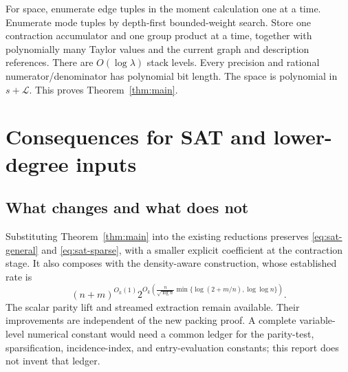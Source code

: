 \documentclass[11pt]{article}
\theoremstyle{remark}\newtheorem{remark}[theorem]{Remark}
\newcommand{\LL}{\mathcal L}
\begin{document}
For space, enumerate edge tuples in the moment calculation one at a time. Enumerate mode tuples by depth-first bounded-weight search. Store one contraction accumulator and one group product at a time, together with polynomially many Taylor values and the current graph and description references. There are $O(\log\lambda)$ stack levels. Every precision and rational numerator/denominator has polynomial bit length. The space is polynomial in $s+\LL$. This proves Theorem~\ref{thm:main}.

\section{Consequences for SAT and lower-degree inputs}
\label{sec:applications}

\subsection{What changes and what does not}
Substituting Theorem~\ref{thm:main} into the existing reductions preserves \eqref{eq:sat-general} and \eqref{eq:sat-sparse}, with a smaller explicit coefficient at the contraction stage. It also composes with the density-aware construction, whose established rate is
\[
 (n+m)^{O_k(1)}
 2^{O_k\left(\frac n{\sqrt{\log n}}
       \min\{\log(2+m/n),\log\log n\}\right)}.
\]
The scalar parity lift and streamed extraction remain available. Their improvements are independent of the new packing proof. A complete variable-level numerical constant would need a common ledger for the parity-test, sparsification, incidence-index, and entry-evaluation constants; this report does not invent that ledger.
\end{document}
